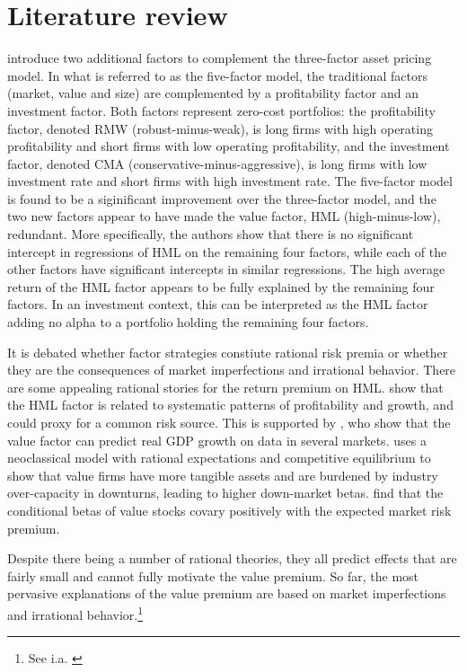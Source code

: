 \section{Literature review}
\textcite{FF2015} introduce two additional factors to complement the \textcite{FamaFrench1993} three-factor asset pricing model. In what is referred to as the five-factor model, the traditional factors (market, value and size) are complemented by a profitability factor and an investment factor. Both factors represent zero-cost portfolios: the profitability factor, denoted RMW (robust-minus-weak), is long firms with high operating profitability and short firms with low operating profitability, and the investment factor, denoted CMA (conservative-minus-aggressive), is long firms with low investment rate and short firms with high investment rate. The five-factor model is found to be a siginificant improvement over the three-factor model, and the two new factors appear to have made the value factor, HML (high-minus-low), redundant. More specifically, the authors show that there is no significant intercept in regressions of HML on the remaining four factors, while each of the other factors have significant intercepts in similar regressions. The high average return of the HML factor appears to be fully explained by the remaining four factors. In an investment context, this can be interpreted as the HML factor adding no alpha to a portfolio holding the remaining four factors.

It is debated whether factor strategies constiute rational risk premia or whether they are the consequences of market imperfections and irrational behavior. There are some appealing rational stories for the return premium on HML. \textcite{FamaFrench1993} show that the HML factor is related to systematic patterns of profitability and growth, and could proxy for a common risk source. This is supported by \textcite{LiewVassalou2000}, who show that the value factor can predict real GDP growth on data in several markets. \textcite{Zhang2005} uses a neoclassical model with rational expectations and competitive equilibrium to show that value firms have more tangible assets and are burdened by industry over-capacity in downturns, leading to higher down-market betas. \textcite{PetkovaZhang2005} find that the conditional betas of value stocks covary positively with the expected market risk premium.

Despite there being a number of rational theories, they all predict effects that are fairly small and cannot fully motivate the value premium. So far, the most pervasive explanations of the value premium are based on market imperfections and irrational behavior.\footnote{See i.a. \textcite{Ilmanen2011}}

